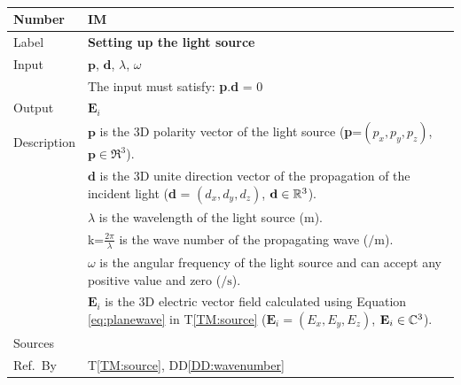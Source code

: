 \documentclass[12pt]{article}
\newcommand{\colBwidth}{0.82\textwidth} \newcommand{\colCwidth}{0.1\textwidth}
\newcounter{instnum} %
\begin{document}
	~\newline \noindent \begin{minipage}{\textwidth}
		\renewcommand*{\arraystretch}{1.5} \begin{tabular}{| p{\colAwidth} |
				p{\colBwidth}|} \hline \rowcolor[gray]{0.9} Number&
			IM{instnum}\theinstnum \label{IM:source}\\ \hline Label& \bf
			Setting up the light source\\ \hline Input&$\textbf{p}$, $\textbf{d}$,
			$\lambda$, $\omega$ \\ & The input must satisfy: \textbf{p}.\textbf{d} = 0 \\
			\hline Output&$\textbf{E}_i$ \\ \hline Description&$\textbf{p}$ is the 3D
			polarity vector of the light source (\textbf{p}=$(p_x,p_y,p_z)$, $\textbf{p} \in
			\Re^3$).\\ &$\textbf{d}$ is the 3D unite direction vector of the propagation
			of the incident light (\textbf{d} = $(d_x,d_y,d_z)$, $\textbf{d}\in \Bbb
			R^3$).\\ &$\lambda$ is the wavelength of the light source ($\si{\meter}$).\\
			&k=$\frac{2 \pi}{\lambda}$ is the wave number of the propagating wave ($\si{\per
				\meter}$).\\ & $\omega$ is the angular frequency of the light source and can
			accept any positive value and zero ($\si{\per \second}$).\\ &$\textbf{E}_i$ is
			the 3D electric vector field calculated using Equation \ref{eq:planewave} in
			T\ref{TM:source} ($\textbf{E}_i=(E_x,E_y,E_z)$, $\textbf{E}_i\in \Bbb C^3$). \\
			\hline Sources& \cite{monk2003finite} \\ \hline Ref.\ By &  T\ref{TM:source},
			DD\ref{DD:wavenumber}\\ \hline \end{tabular} \end{minipage}\\
	
	
	
	
	
	
	
\end{document}
